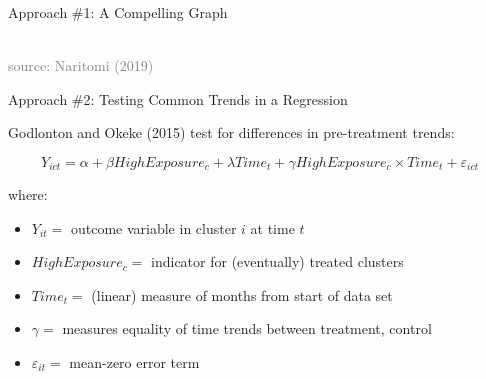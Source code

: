 \documentclass[10pt,xcolor=table,ignorenonframetext,handout,aspectratio=169]{beamer}
\newlength{\wideitemsep}
\let\olditem\item
\renewcommand{\item}{\setlength{\itemsep}{\wideitemsep}\olditem}
\begin{document}

\begin{frame}{Approach \#1:  A Compelling Graph}

\medskip
\begin{center}
 \\
\tiny{\textcolor{gray}{source:  Naritomi (2019)}}
\end{center}

\end{frame}



\begin{frame}{Approach \#2:  Testing Common Trends in a Regression}

\medskip
Godlonton and Okeke (2015) test for differences in pre-treatment trends:
\begin{small}
\begin{equation*}
Y_{ict} = \alpha + \beta HighExposure_c + \lambda Time_t + \gamma HighExposure_c \times Time_t   + \varepsilon_{ict}
\end{equation*}
\end{small}

\vspace{-0.5cm}

where:

\medskip
\begin{small}
\begin{itemize}

\item $Y_{it} = $ outcome variable in cluster $i$ at time $t$

\item $HighExposure_c = $ indicator for (eventually) treated clusters

\item $Time_t = $ (linear) measure of months from start of data set

\item $\gamma = $ measures equality of time trends between treatment, control

\item $ \varepsilon_{it} = $ mean-zero error term

\end{itemize}
\end{small}

\end{frame}
\end{document}
